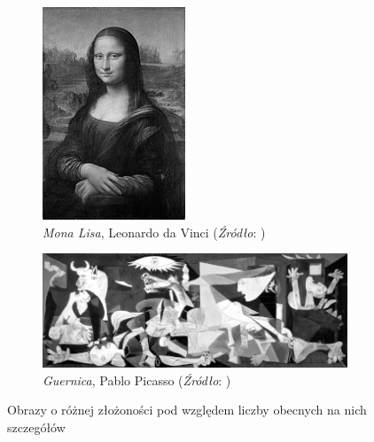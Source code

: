 \begin{figure}[!htb]
\begin{subfigure}[b]{0.3\textwidth}
         \includegraphics[width=\textwidth]{images/complexity/originals/mona_bw.jpg}
         \caption{\textit{Mona Lisa}, Leonardo da Vinci (\textit{Źródło}: \cite{MonaLisa})}
    \end{subfigure}
    \begin{subfigure}[b]{0.8\textwidth}
        \centering
        \label{fig:complexity_guernica}
         \includegraphics[width=\textwidth]{images/complexity/originals/gueranica_bw.png}
         \caption{\textit{Guernica}, Pablo Picasso (\textit{Źródło}: \cite{Guernica})}
    \end{subfigure}
    \caption{Obrazy o różnej złożoności pod względem liczby obecnych na nich szczegółów}
    \label{fig:complexity_original}
\end{figure}

